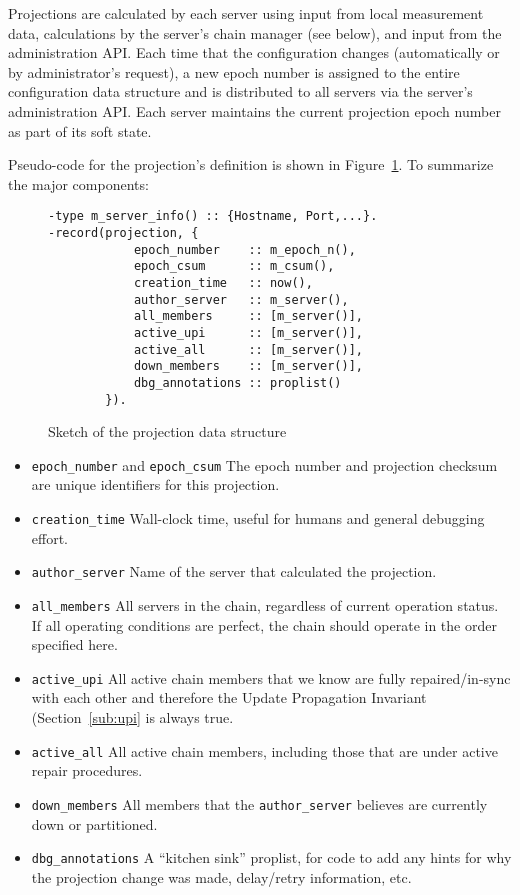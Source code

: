 \documentclass[preprint,10pt]{sigplanconf}
\begin{document}
Projections are calculated by each server using input from local
measurement data, calculations by the server's chain manager
(see below), and input from the administration API.
Each time that the configuration changes (automatically or by
administrator's request), a new epoch number is assigned
to the entire configuration data structure and is distributed to
all servers via the server's administration API.  Each server maintains the
current projection epoch number as part of its soft state.

Pseudo-code for the projection's definition is shown in
Figure~\ref{fig:projection}.  To summarize the major components:

\begin{figure}
\begin{verbatim}
-type m_server_info() :: {Hostname, Port,...}.
-record(projection, {
            epoch_number    :: m_epoch_n(),
            epoch_csum      :: m_csum(),
            creation_time   :: now(),
            author_server   :: m_server(),
            all_members     :: [m_server()],
            active_upi      :: [m_server()],
            active_all      :: [m_server()],
            down_members    :: [m_server()],
            dbg_annotations :: proplist()
        }).
\end{verbatim}
\caption{Sketch of the projection data structure}
\label{fig:projection}
\end{figure}

\begin{itemize}
\item {\tt epoch\_number} and {\tt epoch\_csum} The epoch number and
  projection checksum are unique identifiers for this projection.
\item {\tt creation\_time} Wall-clock time, useful for humans and
  general debugging effort.
\item {\tt author\_server} Name of the server that calculated the projection.
\item {\tt all\_members} All servers in the chain, regardless of current
  operation status.  If all operating conditions are perfect, the
  chain should operate in the order specified here.
\item {\tt active\_upi} All active chain members that we know are
  fully repaired/in-sync with each other and therefore the Update
  Propagation Invariant (Section~\ref{sub:upi} is always true.
\item {\tt active\_all} All active chain members, including those that
  are under active repair procedures.
\item {\tt down\_members} All members that the {\tt author\_server}
  believes are currently down or partitioned.
\item {\tt dbg\_annotations} A ``kitchen sink'' proplist, for code to
  add any hints for why the projection change was made, delay/retry
  information, etc.
\end{itemize}
\end{document}
